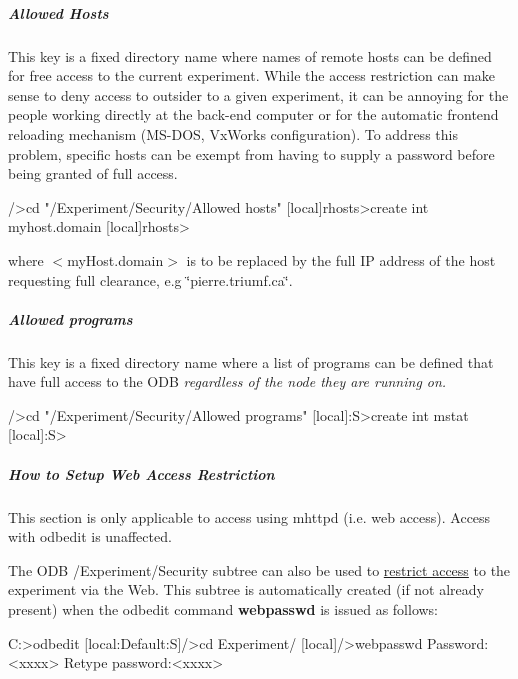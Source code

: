 \hypertarget{RC_customize_ODB_RC_security_allowed_hosts}{}\subparagraph{Allowed Hosts}\label{RC_customize_ODB_RC_security_allowed_hosts}
This key is a fixed directory name where names of remote hosts can be defined for free access to the current experiment. While the access restriction can make sense to deny access to outsider to a given experiment, it can be annoying for the people working directly at the back-\/end computer or for the automatic frontend reloading mechanism (MS-\/DOS, VxWorks configuration). To address this problem, specific hosts can be exempt from having to supply a password before being granted of full access.


\begin{DoxyCode}
  [local]/>cd "/Experiment/Security/Allowed hosts"
  [local]rhosts>create int myhost.domain
  [local]rhosts>
\end{DoxyCode}
 where $<$myHost.domain$>$ is to be replaced by the full IP address of the host requesting full clearance, e.g \char`\"{}pierre.triumf.ca\char`\"{}.\hypertarget{RC_customize_ODB_RC_security_allowed_programs}{}\subparagraph{Allowed programs}\label{RC_customize_ODB_RC_security_allowed_programs}
This key is a fixed directory name where a list of programs can be defined that have full access to the ODB {\itshape regardless of the node they are running on.\/} 
\begin{DoxyCode}
  [local]/>cd "/Experiment/Security/Allowed programs"
  [local]:S>create int mstat
  [local]:S>
\end{DoxyCode}
 \par
\par


\par


\par
 \label{RC_customize_ODB_idx_ODB_tree_Experiment_Security_Restrict-Web-access}
\hypertarget{RC_customize_ODB_idx_ODB_tree_Experiment_Security_Restrict-Web-access}{}
 \hypertarget{RC_customize_ODB_RC_Setup_Web_Security}{}\subparagraph{How to Setup Web Access Restriction}\label{RC_customize_ODB_RC_Setup_Web_Security}
\label{RC_customize_ODB_idx_access-control_web}
\hypertarget{RC_customize_ODB_idx_access-control_web}{}


This section is only applicable to access using mhttpd (i.e. web access). Access with odbedit is unaffected.

The ODB /Experiment/Security subtree can also be used to \hyperlink{RC_customize_ODB_RC_Access_Control}{restrict access} to the experiment via the Web. This subtree is automatically created (if not already present) when the odbedit command {\bfseries webpasswd} is issued as follows: 
\begin{DoxyCode}
  C:\online>odbedit
  [local:Default:S]/>cd Experiment/
  [local]/>webpasswd
  Password:<xxxx>
  Retype password:<xxxx>
\end{DoxyCode}



